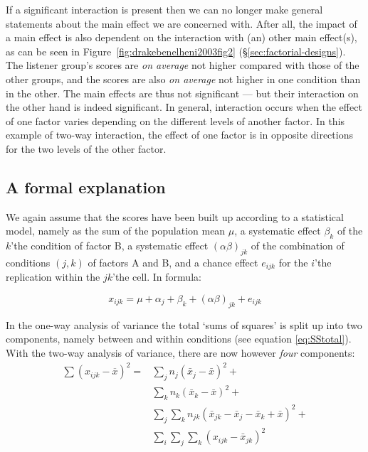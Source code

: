 \documentclass[
]{book}
\begin{document}
If a significant interaction is present then we can no longer make
general statements about the main effect we are concerned with. After all, the
impact of a main effect is also dependent on the interaction with
(an) other main effect(s), as can be seen in
Figure~\ref{fig:drakebenelheni2003fig2} (§\ref{sec:factorial-designs}).
The listener group's scores are \emph{on average}
not higher compared with those of the other groups,
and the scores are also \emph{on average} not higher in one condition than in the other.
The main effects are thus not significant --- but their interaction
on the other hand is indeed significant. In general, interaction occurs when the effect of one factor varies depending on the different levels of another factor.
In this example of two-way interaction, the effect of one factor is in opposite directions for the two levels of the other factor.

\hypertarget{a-formal-explanation}{%
\subsection{A formal explanation}\label{a-formal-explanation}}

We again assume that the scores have been built up according to
a statistical model, namely as the sum of the population mean
\(\mu\), a systematic effect \(\beta_k\) of the \(k\)'the condition of
factor B, a systematic effect \((\alpha\beta)_{jk}\) of the combination
of conditions \((j,k)\) of factors A and B, and a chance effect
\(e_{ijk}\) for the \(i\)'the replication within the \(jk\)'the cell. In formula:

\[x_{ijk} = \mu + \alpha_{j} + \beta_{k} + (\alpha\beta)_{jk} + e_{ijk}\]

In the one-way analysis of variance the total `sums of squares' is split up
into two components, namely between and within conditions (see
equation \eqref{eq:SStotal}).
With the two-way analysis of variance, there are now however
\emph{four} components:
\begin{align}
  \label{eq:SStotal2way}
    { \sum (x_{ijk} - \overline{x})^2 } = &  { \sum_j n_j (\bar{x}_j - \bar{x})^2 } + \\ 
    & { \sum_k n_k (\bar{x}_k - \bar{x})^2 } +  \\
    & { \sum_j \sum_k n_{jk} (\bar{x}_{jk} - \bar{x}_j - \bar{x}_k + \bar{x})^2 } + \\
    & { \sum_i \sum_j \sum_k (x_{ijk} - \bar{x}_{jk})^2 } 
\end{align}
\end{document}
